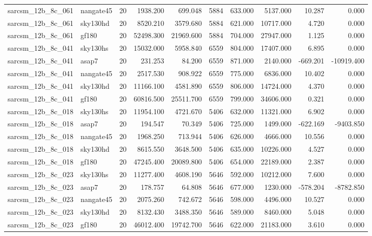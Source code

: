 \begin{longtable}{llrrrrrrrr}
sarcsm\_12b\_8c\_061 & nangate45 & 20 & 1938.200 & 699.048 & 5884 & 633.000 & 5137.000 & 10.287 & 0.000 \\
sarcsm\_12b\_8c\_061 & sky130hd & 20 & 8520.210 & 3579.680 & 5884 & 621.000 & 10717.000 & 4.720 & 0.000 \\
sarcsm\_12b\_8c\_061 & gf180 & 20 & 52498.300 & 21969.600 & 5884 & 704.000 & 27947.000 & 1.125 & 0.000 \\
sarcsm\_12b\_8c\_041 & sky130hs & 20 & 15032.000 & 5958.840 & 6559 & 804.000 & 17407.000 & 6.895 & 0.000 \\
sarcsm\_12b\_8c\_041 & asap7 & 20 & 231.253 & 84.200 & 6559 & 871.000 & 2140.000 & -669.201 & -10919.400 \\
sarcsm\_12b\_8c\_041 & nangate45 & 20 & 2517.530 & 908.922 & 6559 & 775.000 & 6836.000 & 10.402 & 0.000 \\
sarcsm\_12b\_8c\_041 & sky130hd & 20 & 11166.100 & 4581.890 & 6559 & 806.000 & 14724.000 & 4.370 & 0.000 \\
sarcsm\_12b\_8c\_041 & gf180 & 20 & 60816.500 & 25511.700 & 6559 & 799.000 & 34606.000 & 0.321 & 0.000 \\
sarcsm\_12b\_8c\_018 & sky130hs & 20 & 11954.100 & 4721.670 & 5406 & 632.000 & 11321.000 & 6.902 & 0.000 \\
sarcsm\_12b\_8c\_018 & asap7 & 20 & 194.547 & 70.349 & 5406 & 725.000 & 1499.000 & -622.169 & -9403.850 \\
sarcsm\_12b\_8c\_018 & nangate45 & 20 & 1968.250 & 713.944 & 5406 & 626.000 & 4666.000 & 10.556 & 0.000 \\
sarcsm\_12b\_8c\_018 & sky130hd & 20 & 8615.550 & 3648.500 & 5406 & 635.000 & 10226.000 & 4.527 & 0.000 \\
sarcsm\_12b\_8c\_018 & gf180 & 20 & 47245.400 & 20089.800 & 5406 & 654.000 & 22189.000 & 2.387 & 0.000 \\
sarcsm\_12b\_8c\_023 & sky130hs & 20 & 11277.400 & 4608.190 & 5646 & 592.000 & 10212.000 & 7.600 & 0.000 \\
sarcsm\_12b\_8c\_023 & asap7 & 20 & 178.757 & 64.808 & 5646 & 677.000 & 1230.000 & -578.204 & -8782.850 \\
sarcsm\_12b\_8c\_023 & nangate45 & 20 & 2075.260 & 742.672 & 5646 & 598.000 & 4496.000 & 10.527 & 0.000 \\
sarcsm\_12b\_8c\_023 & sky130hd & 20 & 8132.430 & 3488.350 & 5646 & 589.000 & 8460.000 & 5.048 & 0.000 \\
sarcsm\_12b\_8c\_023 & gf180 & 20 & 46012.400 & 19742.700 & 5646 & 622.000 & 21183.000 & 3.610 & 0.000 \\

\end{longtable}

